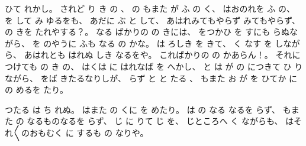 ひて
れかし。
%
されど
り
き
の
、
%
の
もまた
が
ふ
の
く、
%
はおのれを
ふ
の、
%
を
して
み
ゆるをも、
%
あだに
ぶ
と
して、
%
あはれみてもやらず
みてもやらず、
%
の
きを
たれやする？。
%
なる
ばかりの
の
きには、
%
をつかひ
を
すにも
らぬながら、
%
を
のやうに
ふも
なる
の
かな。
%
は
ろしき
を
きて、
%
く
なす
を
しながら、
%
あはれとも
はれぬ
しき
なるをや。
%
こればかりの
の
かあらん！。
%
それにつけても
の
き
の、
%
はくは
に
はれなば
を
へかし、
%
と
は
が
の
につきて
ひ
りながら、
%
をば
きたるなりしが、
%
らず
と
と
たる
、
%
もまた
お
が
を
ひてか
に
の
めるを
たり。

つたる
は
ち
れぬ。
%
はまた
の
くに
を
めたり。
%
は
の
なる
なるを
らず、
%
もまた
の
なるものなるを
らず、
%
じ
に
りて
じ
を、
%
じところへ
く
ながらも、
%
はそれ〳〵のおもむく
に
するも
の
なりや。

